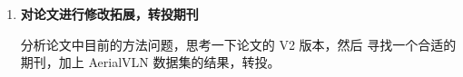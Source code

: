 \documentclass[10pt,letterpaper,oneside]{article}
\begin{document}
\begin{enumerate}\setlength\itemsep{-\parsep}
  \item \Large\textbf{对论文进行修改拓展，转投期刊} 
  
  \normalsize{
      分析论文中目前的方法问题，思考一下论文的 V2 版本，然后
      寻找一个合适的期刊，加上 AerialVLN 数据集的结果，转投。
  }

  \normalsize{

      
      

    
  }


\end{enumerate}
\end{document}
